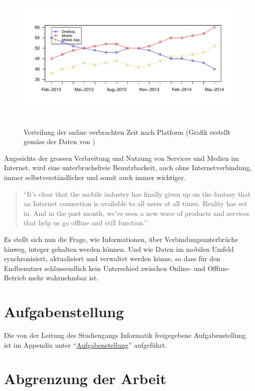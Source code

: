\documentclass[oneside,11pt,parskip=half,ngerman]{scrreprt}
\makeatletter
\def\maxwidth{\ifdim\Gin@nat@width>\linewidth\linewidth
\else\Gin@nat@width\fi}
\let\Oldincludegraphics\includegraphics
\renewcommand{\includegraphics}[1]{\Oldincludegraphics[width=\maxwidth,height=20em,keepaspectratio]{#1}}
\makeatother
\begin{document}
\begin{figure}[htbp]
\centering
\includegraphics{img/Share-of-US-Digital-Media-Time-Spent-by-Platform.pdf}
\caption{Verteilung der online verbrachten Zeit nach Platform (Grafik
erstellt gemäss der Daten von \autocite{comescore-mobiletrends})}
\end{figure}

Angesichts der grossen Verbreitung und Nutzung von Services und Medien
im Internet, wird eine unterbruchsfreie Benutzbarkeit, auch ohne
Internetverbindung, immer selbstverständlicher und somit auch immer
wichtiger.

\begin{quote}
\enquote{It's clear that the mobile industry has finally given up on the
fantasy that an Internet connection is available to all users at all
times. Reality has set in. And in the past month, we've seen a new wave
of products and services that help us go offline and still function.}
\textcite{cw-mobiletrends}
\end{quote}

Es stellt sich nun die Frage, wie Informationen, über
Verbindungsunterbrüche hinweg, integer gehalten werden können. Und wie
Daten im mobilen Umfeld synchronisiert, aktualisiert und verwaltet
werden könne, so dass für den Endbenutzer schlussendlich kein
Unterschied zwischen Online- und Offline-Betrieb mehr wahrnehmbar ist.

\section{Aufgabenstellung}\label{aufgabenstellung}

Die von der Leitung des Studiengangs Informatik freigegebene
Aufgabenstellung ist im Appendix unter
\enquote{\hyperref[appendixux5faufgabenstellung]{Aufgabenstellung}}
aufgeführt.

\section{Abgrenzung der Arbeit}\label{abgrenzung-der-arbeit}
\end{document}
